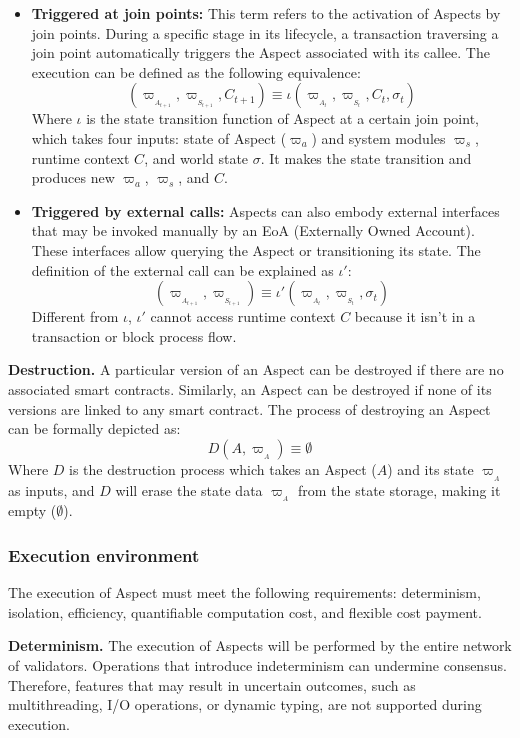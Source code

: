\begin{itemize}
  \item \textbf{Triggered at join points:} This term refers to the activation of Aspects by join points. During a specific stage in its lifecycle, a transaction traversing a join point automatically triggers the Aspect associated with its callee. The execution can be defined as the following equivalence:
  \[
  (\varpi_{_{A_{t+1}}},\varpi_{_{S_{t+1}}},C_{t+1}) \equiv \iota(\varpi_{_{A_{t}}},\varpi_{_{S_{t}}},C_{t}, \sigma_t)
  \]
  Where $\iota$ is the state transition function of Aspect at a certain join point, which takes four inputs: state of Aspect ($\varpi_{a}$) and system modules $\varpi_{s}$, runtime context $C$, and world state $\sigma$. It makes the state transition and produces new $\varpi_{a}$, $\varpi_{s}$, and $C$.
  
  \item \textbf{Triggered by external calls:} Aspects can also embody external interfaces that may be invoked manually by an EoA (Externally Owned Account). These interfaces allow querying the Aspect or transitioning its state. The definition of the external call can be explained as $\iota'$:
  \[
  (\varpi_{_{A_{t+1}}},\varpi_{_{S_{t+1}}}) \equiv \iota'(\varpi_{_{A_{t}}},\varpi_{_{S_{t}}},\sigma_{t})
  \]
  Different from $\iota$, $\iota'$ cannot access runtime context $C$ because it isn't in a transaction or block process flow.
\end{itemize}

\textbf{Destruction.} A particular version of an Aspect can be destroyed if there are no associated smart contracts. Similarly, an Aspect can be destroyed if none of its versions are linked to any smart contract. The process of destroying an Aspect can be formally depicted as:
\[
D(A,\varpi_{_A}) \equiv \emptyset
\]
Where $D$ is the destruction process which takes an Aspect ($A$) and its state $\varpi_{_A}$ as inputs, and $D$ will erase the state data $\varpi_{_A}$ from the state storage, making it empty ($\emptyset$).

\subsubsection{Execution environment}

The execution of Aspect must meet the following requirements: determinism, isolation, efficiency, quantifiable computation cost, and flexible cost payment.

\textbf{Determinism.} The execution of Aspects will be performed by the entire network of validators. Operations that introduce indeterminism can undermine consensus. Therefore, features that may result in uncertain outcomes, such as multithreading, I/O operations, or dynamic typing, are not supported during execution.

